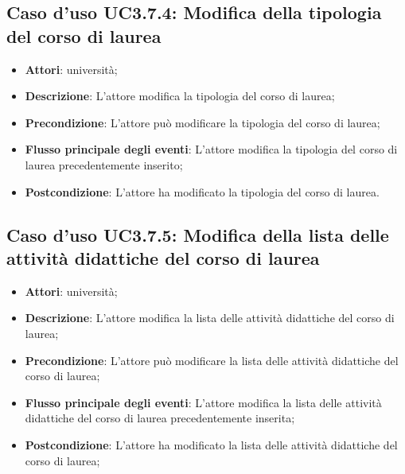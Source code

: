 \subsection{Caso d'uso \texorpdfstring{UC3.7.4}{UC3.7.4}: Modifica della tipologia del corso di laurea}
\begin{itemize}
\item \textbf{Attori}: università;
\item \textbf{Descrizione}: L'attore modifica la tipologia del corso di laurea;

\item \textbf{Precondizione}: L'attore può modificare la tipologia del corso di laurea;

\item \textbf{Flusso principale degli eventi}: L'attore modifica la tipologia del corso di laurea precedentemente inserito;

\item \textbf{Postcondizione}: L'attore ha modificato la tipologia del corso di laurea.

\end{itemize}
\subsection{Caso d'uso \texorpdfstring{UC3.7.5}{UC3.7.5}: Modifica della lista delle attività didattiche del corso di laurea}
\begin{itemize}
\item \textbf{Attori}: università;
\item \textbf{Descrizione}: L'attore modifica la lista delle attività didattiche del corso di laurea;

\item \textbf{Precondizione}: L'attore può modificare la lista delle attività didattiche del corso di laurea;

\item \textbf{Flusso principale degli eventi}: L'attore modifica la lista delle attività didattiche del corso di laurea precedentemente inserita;

\item \textbf{Postcondizione}: L'attore ha modificato la lista delle attività didattiche del corso di laurea;

\end{itemize}
